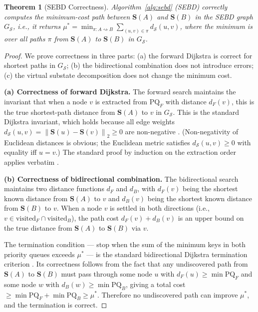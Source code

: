 \documentclass[twocolumn]{article}
\theoremstyle{plain}
\newtheorem{theorem}{Theorem}[section]
\theoremstyle{definition}
\newcommand{\ScS}{\mathcal{S}}
\newcommand{\bS}{\mathbf{S}}
\newcommand{\dS}{d_{\mathcal{S}}}
\newcommand{\norm}[1]{\left\lVert #1 \right\rVert}
\begin{document}
\begin{theorem}[SEBD Correctness]
\label{thm:correctness}
Algorithm~\ref{alg:sebd} (SEBD) correctly computes the minimum-cost path between
$\bS(A)$ and $\bS(B)$ in the SEBD graph $G_\ScS$, i.e., it returns
$\mu^* = \min_{\pi: A \rightsquigarrow B} \sum_{(u,v) \in \pi} \dS(u,v)$,
where the minimum is over all paths $\pi$ from $\bS(A)$ to $\bS(B)$ in $G_\ScS$.
\end{theorem}

\begin{proof}
We prove correctness in three parts: (a) the forward Dijkstra is correct for
shortest paths in $G_\ScS$; (b) the bidirectional combination does not introduce
errors; (c) the virtual substate decomposition does not change the minimum cost.

\textbf{(a) Correctness of forward Dijkstra.} The forward search maintains
the invariant that when a node $v$ is extracted from $\text{PQ}_F$ with distance
$d_F(v)$, this is the true shortest-path distance from $\bS(A)$ to $v$ in
$G_\ScS$. This is the standard Dijkstra invariant, which holds because all edge
weights $\dS(u,v) = \norm{\bS(u) - \bS(v)}_2 \geq 0$ are non-negative
\cite{dijkstra1959note, cormen2009introduction}. (Non-negativity of Euclidean
distances is obvious; the Euclidean metric satisfies $\dS(u,v) \geq 0$ with
equality iff $u = v$.) The standard proof by induction on the extraction order
applies verbatim \cite{cormen2009introduction}.

\textbf{(b) Correctness of bidirectional combination.} The bidirectional
search maintains two distance functions $d_F$ and $d_B$, with $d_F(v)$ being
the shortest known distance from $\bS(A)$ to $v$ and $d_B(v)$ being the
shortest known distance from $\bS(B)$ to $v$. When a node $v$ is settled in
both directions (i.e., $v \in \text{visited}_F \cap \text{visited}_B$), the
path cost $d_F(v) + d_B(v)$ is an upper bound on the true distance from
$\bS(A)$ to $\bS(B)$ via $v$.

The termination condition --- stop when the sum of the minimum keys in both
priority queues exceeds $\mu^*$ --- is the standard bidirectional Dijkstra
termination criterion \cite{pohl1971bi}. Its correctness follows from the fact
that any undiscovered path from $\bS(A)$ to $\bS(B)$ must pass through some
node $u$ with $d_F(u) \geq \min \text{PQ}_F$ and some node $w$ with $d_B(w)
\geq \min \text{PQ}_B$, giving a total cost $\geq \min \text{PQ}_F + \min
\text{PQ}_B \geq \mu^*$. Therefore no undiscovered path can improve $\mu^*$,
and the termination is correct.


\end{proof}
\end{document}
